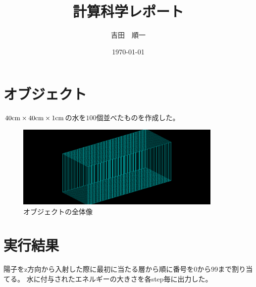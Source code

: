 \documentclass[a4paper]{jsarticle}
\title{計算科学レポート}
\author{吉田　順一}
\date{\today}
\begin{document}
\maketitle
%
%
\section{オブジェクト}
$40 \rm{cm}\times 40\rm{cm} \times 1\rm{cm} $の水を$100$個並べたものを作成した。
\begin{figure}[h]
\centering
\includegraphics[width=10cm]{figure1.png}
\caption{オブジェクトの全体像}
\end{figure}

\section{実行結果}
陽子をz方向から入射した際に最初に当たる層から順に番号を0から99まで割り当てる。
水に付与されたエネルギーの大きさを各step毎に出力した。\\
\end{document}
